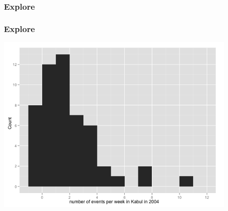 \documentclass[xcolor=dvipsnames, 9pt]{beamer}
\begin{document}
{
\begin{frame}
    \frametitle{Explore}
\end{frame}
}

\begin{frame}
    \frametitle{Explore}
    \begin{center}
    \includegraphics[width=0.9\textwidth]{histogram.png}
    \end{center}
\end{frame}
\end{document}

